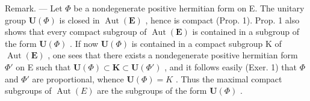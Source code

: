 Remark. --- Let \(\Phi\) be a nondegenerate positive hermitian form on E. The unitary group \(\mathbf{U}(\Phi)\) is closed in \(\operatorname{Aut}(\mathbf{E})\) , hence is compact (Prop. 1). Prop. 1 also shows that every compact subgroup of \(\operatorname{Aut}(\mathbf{E})\) is contained in a subgroup of the form \(\mathbf{U}(\Phi)\) . If now \(\mathbf{U}(\Phi)\) is contained in a compact subgroup K of \(\operatorname{Aut}(\mathbf{E})\) , one sees that there exists a nondegenerate positive hermitian form \(\Phi'\) on E such that \(\mathbf{U}(\Phi) \subset \mathbf{K} \subset \mathbf{U}(\Phi')\) , and it follows easily (Exer. 1) that \(\Phi\) and \(\Phi'\) are proportional, whence \(\mathbf{U}(\Phi) = K\) . Thus the maximal compact subgroups of \(\operatorname{Aut}(E)\) are the subgroups of the form \(\mathbf{U}(\Phi)\) .

